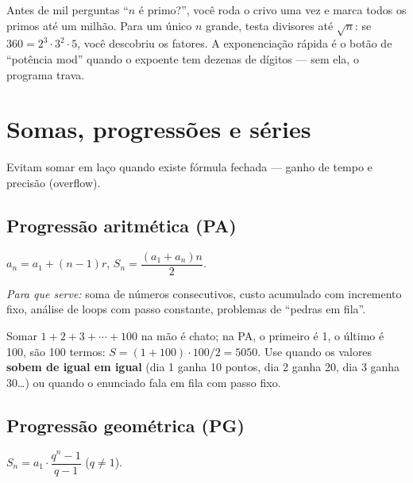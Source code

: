 \begin{exemplodiabox}
Antes de mil perguntas ``$n$ é primo?'', você roda o crivo uma vez e marca todos os primos até um milhão. Para um único $n$ grande, testa divisores até $\sqrt{n}$: se $360 = 2^3 \cdot 3^2 \cdot 5$, você descobriu os fatores. A exponenciação rápida é o botão de ``potência mod'' quando o expoente tem dezenas de dígitos --- sem ela, o programa trava.
\end{exemplodiabox}



\section{Somas, progressões e séries}

Evitam somar em laço quando existe fórmula fechada --- ganho de tempo e precisão (overflow).

\subsection{Progressão aritmética (PA)}

$a_n = a_1 + (n-1)r$, \quad $S_n = \dfrac{(a_1 + a_n)n}{2}$.

\emph{Para que serve:} soma de números consecutivos, custo acumulado com incremento fixo, análise de loops com passo constante, problemas de ``pedras em fila''.

\begin{exemplodiabox}
Somar $1 + 2 + 3 + \cdots + 100$ na mão é chato; na PA, o primeiro é 1, o último é 100, são 100 termos: $S = (1+100)\cdot 100 / 2 = 5050$. Use quando os valores \textbf{sobem de igual em igual} (dia 1 ganha 10 pontos, dia 2 ganha 20, dia 3 ganha 30\ldots) ou quando o enunciado fala em fila com passo fixo.
\end{exemplodiabox}



\subsection{Progressão geométrica (PG)}

$S_n = a_1 \cdot \dfrac{q^n - 1}{q - 1}$ ($q \neq 1$).

